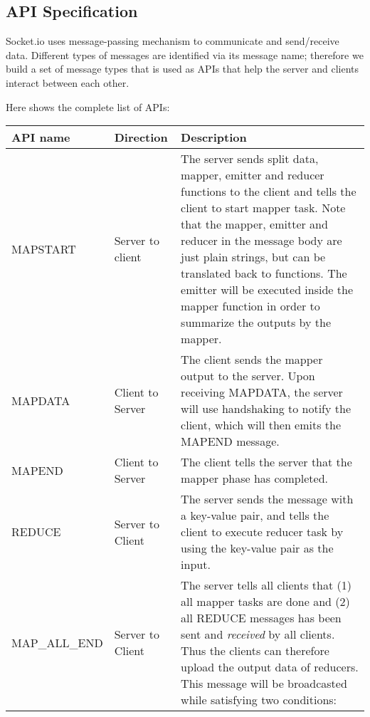 \subsection{API Specification}

Socket.io uses message-passing mechanism to communicate and send/receive data. Different types of messages are identified via its message name; therefore we build a set of message types that is used as APIs that help the server and clients interact between each other.

Here shows the complete list of APIs:

\begin{center}

\begin{tabular}{| l | l | p{7.5cm} |}

\hline
API name & Direction & Description \\
\hline
MAPSTART & Server to client & The server sends split data, mapper, emitter and reducer functions to the client and tells the client to start mapper task. \newline
Note that the mapper, emitter and reducer in the message body are just plain strings, but can be translated back to functions. \newline
The emitter will be executed inside the mapper function in order to summarize the outputs by the mapper. \\
\hline
MAPDATA & Client to Server & The client sends the mapper output to the server. \newline
Upon receiving MAPDATA, the server will use handshaking to notify the client, which will then emits the MAPEND message. \\
\hline
MAPEND & Client to Server & The client tells the server that the mapper phase has completed. \\
\hline
REDUCE & Server to Client & The server sends the message with a key-value pair, and tells the client to execute reducer task by using the key-value pair as the input. \\
\hline
MAP\_ALL\_END & Server to Client & The server tells all clients that \newline
(1) all mapper tasks are done and \newline
(2) all REDUCE messages has been sent and \emph{received} by all clients. \newline
Thus the clients can therefore upload the output data of reducers. \newline
This message will be broadcasted while satisfying two conditions: \newline

\end{tabular}
\end{center}
